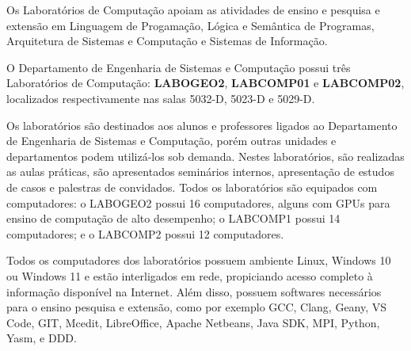 Os Laboratórios de Computação apoiam as atividades de ensino e pesquisa e extensão em Linguagem de Progamação, Lógica e Semântica de Programas, Arquitetura de Sistemas e Computação e Sistemas de Informação.

O Departamento de Engenharia de Sistemas e Computação possui três Laboratórios de Computação: \textbf{LABOGEO2},  \textbf{LABCOMP01} e \textbf{LABCOMP02}, localizados respectivamente nas salas 5032-D, 5023-D e 5029-D.

Os laboratórios são destinados aos alunos e professores ligados ao Departamento de Engenharia de Sistemas e Computação, porém outras unidades e departamentos podem utilizá-los sob demanda. Nestes laboratórios, são realizadas as aulas práticas, são apresentados seminários internos, apresentação de estudos de casos e palestras de convidados. Todos os laboratórios são equipados com computadores: o LABOGEO2 possui 16 computadores, alguns com GPUs para ensino de computação de alto desempenho; o LABCOMP1 possui 14 computadores; e o LABCOMP2 possui 12 computadores.


Todos os computadores dos laboratórios possuem ambiente Linux, Windows 10 ou Windows 11 e estão interligados em rede, propiciando acesso completo à informação disponível na Internet. Além disso, possuem softwares necessários para o ensino pesquisa e extensão, como por exemplo GCC,
Clang,
Geany,
VS Code,
GIT,
Mcedit,
LibreOffice,
Apache Netbeans,
Java SDK,
MPI, 
Python, 
Yasm, e
DDD.

